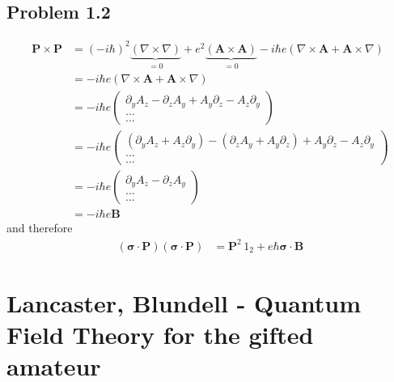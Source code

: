 \documentclass[10pt,a4paper]{book}
\theoremstyle{definition}
\begin{document}
\subsection{Problem 1.2}
\begin{align}
\mathbf{P}\times\mathbf{P}
&=(-i\hbar)^2\underbrace{(\nabla\times\nabla)}_{=0}+e^2\underbrace{(\mathbf{A}\times\mathbf{A})}_{=0}-i\hbar e(\nabla\times\mathbf{A}+\mathbf{A}\times\nabla)\\
&=-i\hbar e(\nabla\times\mathbf{A}+\mathbf{A}\times\nabla)\\
&=-i\hbar e\left(\begin{matrix}
\partial_yA_z-\partial_zA_y+A_y\partial_z-A_z\partial_y\\
...\\
...
\end{matrix}\right)\\
&=-i\hbar e\left(\begin{matrix}
(\partial_yA_z+A_z\partial_y)-(\partial_zA_y+A_y\partial_z)+A_y\partial_z-A_z\partial_y\\
...\\
...
\end{matrix}\right)\\
&=-i\hbar e\left(\begin{matrix}
\partial_yA_z-\partial_zA_y\\
...\\
...
\end{matrix}\right)\\
&=-i\hbar e\mathbf{B}
\end{align}
and therefore
\begin{align}
(\mathbf{\sigma}\cdot\mathbf{P})(\mathbf{\sigma}\cdot\mathbf{P})
&=\mathbf{P}^2\,1_2+e\hbar\mathbf{\sigma}\cdot\mathbf{B}
\end{align}

\section{{\sc Lancaster, Blundell} - Quantum Field Theory for the gifted amateur}
\end{document}

